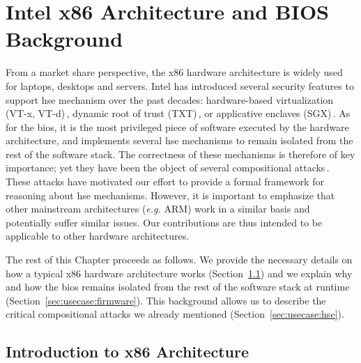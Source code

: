 \chapter{Intel x86 Architecture and BIOS Background}
\label{chapter:usecase}


\vspace{1cm}%
\noindent
%
From a market share perspective, the x86 hardware architecture is widely used
for laptops, desktops and servers.
%
Intel has introduced several security features to support \ac{hse} mechanism
over the past decades: hardware-based virtualization (VT-x, VT-d)\,\cite[Volume
  3, Chapter 23]{intel2014manual}, dynamic root of trust
(TXT)\,\cite{intel2015txt}, or applicative enclaves (SGX)\,\cite[Volume 3,
  Chapter 36]{intel2014manual}\cite{costan2016sgxexplained}.
%
As for the \ac{bios}, it is the most privileged piece of software executed by
the hardware architecture, and implements several \ac{hse} mechanisms to remain
isolated from the rest of the software stack.
%
The correctness of these mechanisms is therefore of key importance; yet they
have been the object of several compositional
attacks\,\cite{duflot2009smram,wojtczuk2009smram,domas2015sinkhole,kallenberg2015racecondition,kovah2015senter}.
%
These attacks have motivated our effort to provide a formal framework for
reasoning about \ac{hse} mechanisms.
%
However, it is important to emphasize that other mainstream architectures
(\emph{e.g.}  ARM) work in a similar basis and potentially suffer similar issues.
%
Our contributions are thus intended to be applicable to other hardware
architectures.

The rest of this Chapter proceeds as follows.
%
We provide the necessary details on how a typical x86 hardware architecture
works (Section~\ref{sec:usecase:architecture}) and we explain why and how the
\ac{bios} remains isolated from the rest of the software stack at runtime
(Section~\ref{sec:usecase:firmware}).
%
This background allows us to describe the critical compositional attacks we
already mentioned (Section~\ref{sec:usecase:hse}).

\section{Introduction to x86 Architecture}
\label{sec:usecase:architecture}

